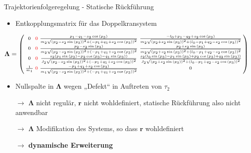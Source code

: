 \documentclass[
	ngerman,
	10pt,				%
	aspectratio=169 	%
]{beamer}
\begin{document}
\begin{frame}[t,fragile,label=trajektorienregelung_4]{\large Trajektorienfolgeregelung - Statische Rückführung}
	
	\begin{itemize}
		\item Entkopplungsmatrix für das Doppelkransystem
	\end{itemize}
	\begin{align*}
		\boldsymbol{\Lambda} = 
		\left(\begin{smallmatrix}
			0 & \textcolor{red}{0} & \frac{p_{1} - q_{1} - s_{2} \cos{\left(p_{3} \right)}}{m_{2} \sqrt{\left(p_{2} - 	s_{2} \sin{\left(p_{3} \right)}\right)^{2} + \left(- p_{1} + q_{1} + s_{2} \cos{\left(p_{3} \right)}\right)^{2}}} & \frac{- l_{0} + p_{1} - q_{2} + s_{2} \cos{\left(p_{3} \right)}}{m_{2} \sqrt{\left(p_{2} + s_{2} \sin{\left(p_{3} \right)}\right)^{2} + \left(l_{0} - p_{1} + q_{2} - s_{2} \cos{\left(p_{3} \right)}\right)^{2}}}\\
			0 & \textcolor{red}{0} & \frac{p_{2} - s_{2} \sin{\left(p_{3} \right)}}{m_{2} \sqrt{\left(p_{2} - s_{2} 	\sin{\left(p_{3} \right)}\right)^{2} + \left(- p_{1} + q_{1} + s_{2} \cos{\left(p_{3} \right)}\right)^{2}}} & \frac{p_{2} + s_{2} \sin{\left(p_{3} \right)}}{m_{2} \sqrt{\left(p_{2} + s_{2} \sin{\left(p_{3} \right)}\right)^{2} + \left(l_{0} - p_{1} + q_{2} - s_{2} \cos{\left(p_{3} \right)}\right)^{2}}}\\
			0 & \textcolor{red}{0} & \frac{s_{2} \left(p_{1} \sin{\left(p_{3} \right)} - p_{2} \cos{\left(p_{3} \right)} - 	q_{1} \sin{\left(p_{3} \right)}\right)}{J_{2} \sqrt{\left(p_{2} - s_{2} \sin{\left(p_{3} \right)}\right)^{2} + \left(- p_{1} + q_{1} + s_{2} \cos{\left(p_{3} \right)}\right)^{2}}} & \frac{s_{2} \left(l_{0} \sin{\left(p_{3} \right)} - p_{1} \sin{\left(p_{3} \right)} + p_{2} \cos{\left(p_{3} \right)} + q_{2} \sin{\left(p_{3} \right)}\right)}{J_{2} \sqrt{\left(p_{2} + s_{2} \sin{\left(p_{3} \right)}\right)^{2} + \left(l_{0} - p_{1} + q_{2} - s_{2} \cos{\left(p_{3} \right)}\right)^{2}}}\\
			\frac{1}{m_{1}} & \textcolor{red}{0} & \frac{- p_{1} + q_{1} + s_{2} \cos{\left(p_{3} \right)}}{m_{1} 	\sqrt{\left(p_{2} - s_{2} \sin{\left(p_{3} \right)}\right)^{2} + \left(- p_{1} + q_{1} + s_{2} \cos{\left(p_{3} \right)}\right)^{2}}} & 0
		\end{smallmatrix}\right)
	\end{align*}
	\pause
	\begin{itemize}
		\item Nullspalte in $\boldsymbol{\Lambda}$ wegen „Defekt“ in Auftreten von $\tau_2$
		\item[$\rightarrow$] $\boldsymbol{\Lambda}$ nicht regulär, $\mathbf{r}$ nicht wohldefiniert, statische Rückführung also nicht anwendbar
		\pause
		\item[$\rightarrow$] $\boldsymbol{\Lambda}$ Modifikation des Systems, so dass $\mathbf{r}$ wohldefiniert
		\pause
		\item[$\rightarrow$] \textbf{dynamische Erweiterung}
	\end{itemize}


\end{frame}
\end{document}
